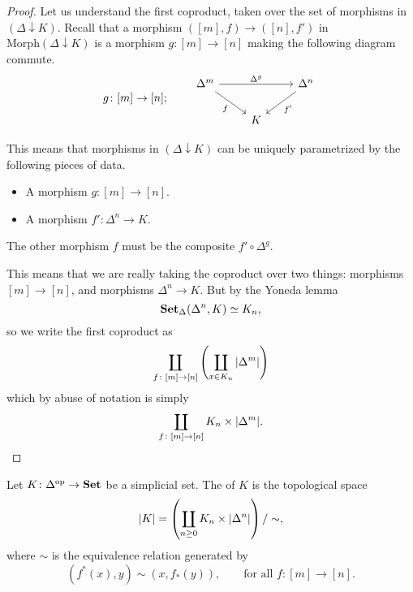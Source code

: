 \documentclass[main.tex]{subfiles}
\begin{document}
\begin{proof}
  Let us understand the first coproduct, taken over the set of morphisms in $(\Delta \downarrow K)$. Recall that a morphism $([m], f) \to ([n], f')$ in $\mathrm{Morph}(\Delta\downarrow K)$ is a morphism $g\colon [m] \to [n]$ making the following diagram commute.
  \begin{equation*}
    g\colon [m] \to [n];\qquad
    \begin{tikzcd}
      \Delta^{m}
      \arrow[rr, "\Delta^{g}"]
      \arrow[rd, swap, "f"]
      && \Delta^{n}
      \arrow[ld, "f'"]
      \\
      & K
    \end{tikzcd}
  \end{equation*}

  This means that morphisms in $(\Delta \downarrow K)$ can be uniquely parametrized by the following pieces of data.
  \begin{itemize}
    \item A morphism $g\colon [m] \to [n]$.

    \item A morphism $f'\colon \Delta^{n} \to K$.
  \end{itemize}
  The other morphism $f$ must be the composite $f' \circ \Delta^{g}$.

  This means that we are really taking the coproduct over two things: morphisms $[m] \to [n]$, and morphisms $\Delta^{n} \to K$. But by the Yoneda lemma
  \begin{equation*}
    \operatorname{\mathbf{Set}_{\Delta}}(\Delta^{n}, K) \simeq K_{n},
  \end{equation*}
  so we write the first coproduct as
  \begin{equation*}
    \coprod_{f\colon [m] \to [n]}\left( \coprod_{x \in K_{n}} {| \Delta^{m} |} \right)
  \end{equation*}
  which by abuse of notation is simply
  \begin{equation*}
    \coprod_{f\colon [m] \to [n]} K_{n} \times {| \Delta^{m} |}.
  \end{equation*}
\end{proof}

Let $K\colon \Delta^{\mathrm{op}} \to \mathbf{Set}$ be a simplicial set. The  of $K$ is the topological space
\begin{equation*}
  {| K |} = \left( \coprod_{n \geq 0} K_{n} \times {| \Delta^{n} |} \right) /\sim,
\end{equation*}
where $\sim$ is the equivalence relation generated by
\begin{equation*}
  (f^{*}(x), y) \sim (x, f_{*}(y)),\qquad \text{for all } f\colon[m] \to [n].
\end{equation*}
\end{document}
